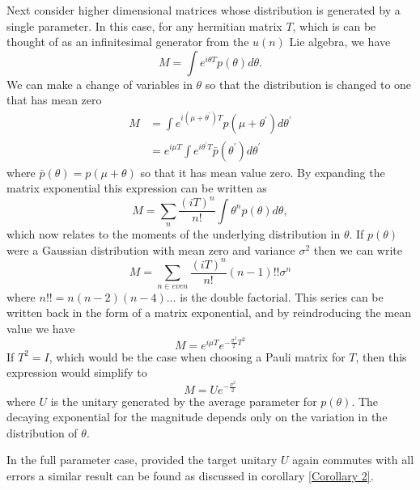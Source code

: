 \documentclass[aps,pra,twocolumn,superscriptaddress,numerical]{revtex4-1}
\begin{document}
Next consider higher dimensional matrices whose distribution is generated by a single parameter.  In this case, for any hermitian matrix $T$, which is can be thought of as an infinitesimal generator from the $u(n)$ Lie algebra, we have
\begin{equation}
	M=\int e^{i\theta T}p(\theta)d\theta 
	\label{eq:single parameter, multi-mode}.
\end{equation}
We can make a change of variables in $\theta$ so that the distribution is changed to one that has mean zero
\begin{align}
	M&=\int e^{i(\mu + \theta^\prime)T} p(\mu + \theta^\prime) d\theta^\prime\\
	&= e^{i\mu T} \int e^{i\theta^\prime T} \bar{p}(\theta^\prime) d\theta^\prime
\end{align}
where $\bar{p}(\theta) = p(\mu + \theta)$ so that it has mean value zero.  By expanding the matrix exponential this expression can be written as
\begin{equation}
	M=\sum_n \frac{(iT)^n}{n!} \int \theta^n p(\theta) d\theta,
\end{equation}
which now relates to the moments of the underlying distribution in $\theta$. If $p(\theta)$ were a Gaussian distribution with mean zero and variance $\sigma^2$ then we can write
\begin{equation}
	M = \sum_{n \in even} \frac{(iT)^n}{n!} (n-1)!! \sigma^n
\end{equation}
where $n!! = n(n-2)(n-4)\dots$ is the double factorial.  This series can be written back in the form of a matrix exponential, and by reindroducing the mean value we have
\begin{equation}
	M = e^{i\mu T} e^{-\frac{\sigma^2}{2} T^2}
\end{equation}
If $T^2=I$, which would be the case when choosing a Pauli matrix for $T$, then this expression would simplify to
\begin{equation}
M=Ue^{-\frac{\sigma^2}{2}}  \label{eq:Gaussian Psuccess}
\end{equation}
where $U$ is the unitary generated by the average parameter for $p(\theta)$.  The decaying exponential for the magnitude depends only on the variation in the distribution of $\theta$.

In the full parameter case, provided the target unitary $U$ again commutes with all errors a similar result can be found as discussed in corollary \ref{Corollary 2}.
\end{document}
